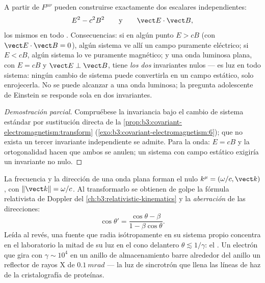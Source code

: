 \begin{proposition}\label{prop:b3:covariant-electromagnetism:invariants}
A partir de $F^{\mu\nu}$ pueden construirse exactamente dos escalares independientes:
\[
E^2 - c^2B^2
\qquad\text{y}\qquad
\vect E\cdot\vect B ,
\]
los mismos en todo . Consecuencias: si en algún punto
$E > cB$ (con $\vect E\cdot\vect B = 0$), algún sistema ve allí un campo
puramente eléctrico; si $E < cB$, algún sistema lo ve puramente magnético; y
una onda luminosa plana, con $E = cB$ y $\vect E\perp\vect B$, tiene
\emph{los dos} invariantes nulos --- es luz en todo sistema: ningún cambio
de sistema puede convertirla en un campo estático, solo enrojecerla. No se
puede alcanzar a una onda luminosa; la pregunta adolescente de Einstein se
responde sola en dos invariantes.
\end{proposition}

\begin{proof}[Demostración parcial]
Compruébese la invariancia bajo el cambio de sistema estándar por
sustitución directa de la
\cref{prop:b3:covariant-electromagnetism:transform}
(\cref{exo:b3:covariant-electromagnetism:6}); que no exista un tercer
invariante independiente se admite. Para la onda: $E = cB$ y la
ortogonalidad hacen que ambos se anulen; un sistema con campo estático
exigiría un invariante no nulo.
\end{proof}

\begin{proposition}\label{prop:b3:covariant-electromagnetism:wavevector}
La frecuencia y la dirección de una onda plana forman el  nulo
$k^\mu = (\omega/c, \vect k)$, con $\|\vect k\| = \omega/c$. Al
transformarlo se obtienen de golpe la fórmula relativista de Doppler del
\cref{ch:b3:relativistic-kinematics} y la \emph{aberración} de las
direcciones:
\[
\cos\theta' = \frac{\cos\theta - \beta}{1 - \beta\cos\theta} .
\]
Leída al revés, una fuente que radia isótropamente en su sistema propio
concentra en el laboratorio la mitad de su luz en el cono delantero $\theta
\lesssim 1/\gamma$: el \emph{}. Un electrón que gira
con $\gamma \sim 10^4$ en un anillo de almacenamiento barre alrededor del
anillo un reflector de rayos X de $\qty{0.1}{mrad}$ --- la luz de
sincrotrón que llena las líneas de haz de la cristalografía de proteínas.
\end{proposition}

